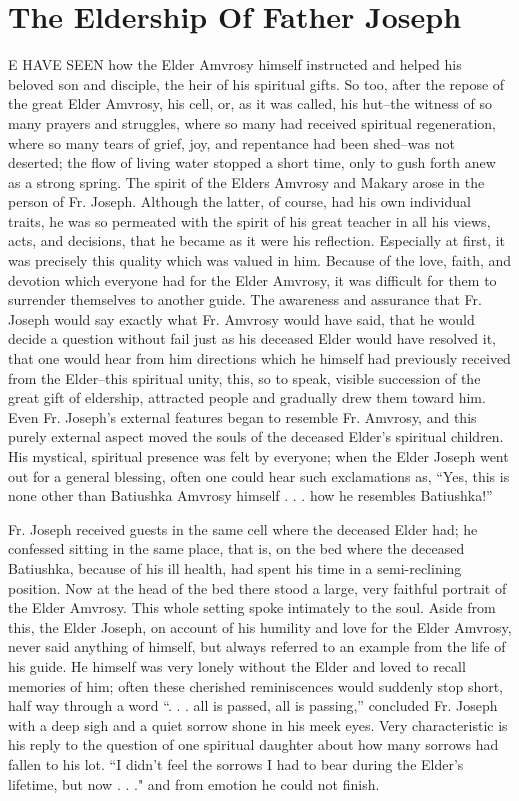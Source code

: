 \chapter{The Eldership Of Father Joseph}
E HAVE SEEN how the Elder Amvrosy himself instructed and helped his beloved son and disciple, the heir of his spiritual gifts. So too, after the repose of the great Elder Amvrosy, his cell, or, as it was called, his hut--the witness of so many prayers and struggles, where so many had received spiritual regeneration, where so many tears of grief, joy, and repentance had been shed--was not deserted; the flow of living water stopped a short time, only to gush forth anew as a strong spring. The spirit of the Elders Amvrosy and Makary arose in the person of Fr. Joseph. Although the latter, of course, had his own individual traits, he was so permeated with the spirit of his great teacher in all his views, acts, and decisions, that he became as it were his reflection. Especially at first, it was precisely this quality which was valued in him. Because of the love, faith, and devotion which everyone had for the Elder Amvrosy, it was difficult for them to surrender themselves to another guide. The awareness and assurance that Fr. Joseph would say exactly what Fr. Amvrosy would have said, that he would decide a question without fail just as his deceased Elder would have resolved it, that one would hear from him directions which he himself had previously received from the Elder--this spiritual unity, this, so to speak, visible succession of the great gift of eldership, attracted people and gradually drew them toward him. Even Fr. Joseph's external features began to resemble Fr. Amvrosy, and this purely external aspect moved the souls of the deceased Elder's spiritual children. His mystical, spiritual presence was felt by everyone; when the Elder Joseph went out for a general blessing, often one could hear such exclamations as, “Yes, this is none other than Batiushka Amvrosy himself . . . how he resembles Batiushka!”

Fr. Joseph received guests in the same cell where the deceased Elder had; he confessed sitting in the same place, that is, on the bed where the deceased Batiushka, because of his ill health, had spent his time in a semi-reclining position. Now at the head of the bed there stood a large, very faithful portrait of the Elder Amvrosy. This whole setting spoke intimately to the soul. Aside from this, the Elder Joseph, on account of his humility and love for the Elder Amvrosy, never said anything of himself, but always referred to an example from the life of his guide. He himself was very lonely without the Elder and loved to recall memories of him; often these cherished reminiscences would suddenly stop short, half way through a word “. . . all is passed, all is passing,” concluded Fr. Joseph with a deep sigh and a quiet sorrow shone in his meek eyes. Very characteristic is his reply to the question of one spiritual daughter about how many sorrows had fallen to his lot. “I didn't feel the sorrows I had to bear during the Elder's lifetime, but now . . ." and from emotion he could not finish.

